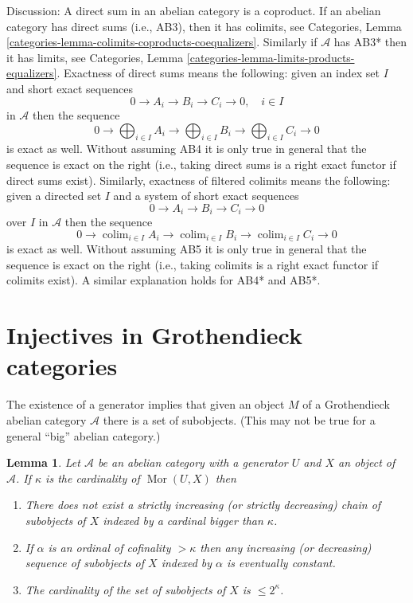 \documentclass{stacks-project}
\theoremstyle{plain}
\newtheorem{lemma}[subsection]{Lemma}
\theoremstyle{definition}
\theoremstyle{remark}
\numberwithin{equation}{subsection}
\def\colim{\mathop{\mathrm{colim}}\nolimits}
\def\Mor{\mathop{\mathrm{Mor}}\nolimits}
\begin{document}
\noindent
Discussion: A direct sum in an abelian category is a coproduct.
If an abelian category has direct sums (i.e., AB3), then it has colimits, see
Categories, Lemma \ref{categories-lemma-colimits-coproducts-coequalizers}. 
Similarly if $\mathcal{A}$ has AB3* then it has limits, see
Categories, Lemma \ref{categories-lemma-limits-products-equalizers}. 
Exactness of direct sums means the following: given an index set $I$
and short exact sequences
$$
0 \to A_i \to B_i \to C_i \to 0,\quad i \in I
$$
in $\mathcal{A}$ then the sequence
$$
0 \to
\bigoplus\nolimits_{i \in I} A_i \to
\bigoplus\nolimits_{i \in I} B_i \to
\bigoplus\nolimits_{i \in I} C_i \to 0
$$
is exact as well. Without assuming AB4 it is only true in general that
the sequence is exact on the right (i.e., taking direct sums is a right
exact functor if direct sums exist). Similarly, exactness of filtered
colimits means the following: given a directed set $I$
and a system of short exact sequences
$$
0 \to A_i \to B_i \to C_i \to 0
$$
over $I$ in $\mathcal{A}$ then the sequence
$$
0 \to
\colim_{i \in I} A_i \to
\colim_{i \in I} B_i \to
\colim_{i \in I} C_i \to 0
$$
is exact as well. Without assuming AB5 it is only true in general that
the sequence is exact on the right (i.e., taking colimits is a right
exact functor if colimits exist). A similar explanation holds for
AB4* and AB5*.



\section{Injectives in Grothendieck categories}
\label{section-grothendieck-categories}

\noindent
The existence of a generator implies that given an object $M$ of a
Grothendieck abelian category $\mathcal{A}$ there is a set of subobjects.
(This may not be true for a general ``big'' abelian category.)

\begin{lemma}
\label{lemma-set-of-subobjects}
Let $\mathcal{A}$ be an abelian category with a generator $U$ and
$X$ an object of $\mathcal{A}$. If $\kappa$ is the cardinality of
$\Mor(U, X)$ then
\begin{enumerate}
\item There does not exist a strictly increasing
(or strictly decreasing) chain of subobjects
of $X$ indexed by a cardinal bigger than $\kappa$.
\item If $\alpha$ is an ordinal of cofinality $> \kappa$
then any increasing (or decreasing) sequence of subobjects
of $X$ indexed by $\alpha$ is eventually constant.
\item The cardinality of the set of subobjects of $X$
is $\leq 2^\kappa$.
\end{enumerate}
\end{lemma}
\end{document}
